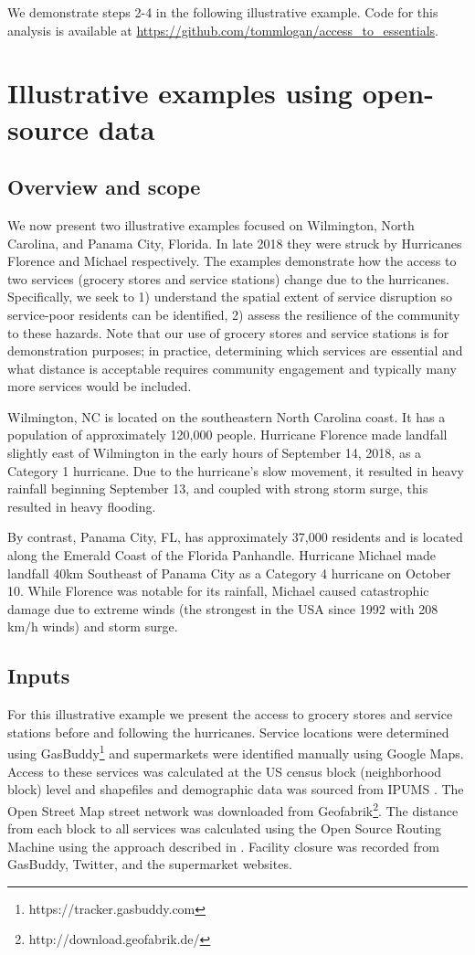 \documentclass[onecolumn,doublespacing]{risa}
\let \citeA \textcite
\let \cite \parencite
\begin{document}
We demonstrate steps 2-4 in the following illustrative example. Code for this analysis is available at \url{https://github.com/tommlogan/access_to_essentials}. 

\section{Illustrative examples using open-source data}
\label{sec:illustrative}

\subsection{Overview and scope}
We now present two illustrative examples focused on Wilmington, North Carolina, and Panama City, Florida.
In late 2018 they were struck by Hurricanes Florence and Michael respectively. 
The examples demonstrate how the access to two services (grocery stores and service stations) change due to the hurricanes. 
Specifically, we seek to 1) understand the spatial extent of service disruption so service-poor residents can be identified, 2) assess the resilience of the community to these hazards. 
Note that our use of grocery stores and service stations is for demonstration purposes; in practice, determining which services are essential and what distance is acceptable requires community engagement and typically many more services would be included. 

Wilmington, NC is located on the southeastern North Carolina coast.
It has a population of approximately 120,000 people. 
Hurricane Florence made landfall slightly east of Wilmington in the early hours of September 14, 2018, as a Category 1 hurricane. 
Due to the hurricane's slow movement, it resulted in heavy rainfall beginning September 13, and coupled with strong storm surge, this resulted in heavy flooding. 

By contrast, Panama City, FL, has approximately 37,000 residents and is located along the Emerald Coast of the Florida Panhandle. 
Hurricane Michael made landfall 40km Southeast of Panama City as a Category 4 hurricane on October 10. 
While Florence was notable for its rainfall, Michael caused catastrophic damage due to extreme winds (the strongest in the USA since 1992 with 208 km/h winds) and storm surge. 

\subsection{Inputs}
For this illustrative example we present the access to grocery stores and service stations before and following the hurricanes. 
Service locations were determined using GasBuddy\footnote{https://tracker.gasbuddy.com} and supermarkets were identified manually using Google Maps.
Access to these services was calculated at the US census block (neighborhood block) level and shapefiles and demographic data was sourced from IPUMS \cite{Manson2018-ug}. 
The Open Street Map street network was downloaded from Geofabrik\footnote{http://download.geofabrik.de/}. 
The distance from each block to all services was calculated using the Open Source Routing Machine using the approach described in \citeA{Logan2017-fr}. 
Facility closure was recorded from GasBuddy, Twitter, and the supermarket websites.
\end{document}

